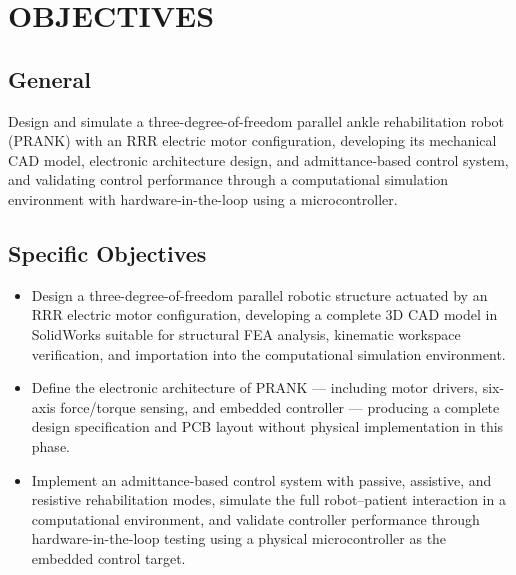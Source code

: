 \chapter{OBJECTIVES}\label{objectives}

\section{General}

Design and simulate a three-degree-of-freedom parallel ankle rehabilitation robot (PRANK)
with an RRR electric motor configuration, developing its mechanical CAD model, electronic
architecture design, and admittance-based control system, and validating control
performance through a computational simulation environment with hardware-in-the-loop using a microcontroller.

\section{Specific Objectives}
\begin{itemize}
    \item Design a three-degree-of-freedom parallel robotic structure actuated by an RRR
    electric motor configuration, developing a complete 3D CAD model in SolidWorks
    suitable for structural FEA analysis, kinematic workspace verification, and
    importation into the computational simulation environment.

    \item Define the electronic architecture of PRANK — including motor drivers, six-axis
    force/torque sensing, and embedded controller — producing a complete
    design specification and PCB layout without physical implementation in this phase.

    \item Implement an admittance-based control system with passive, assistive, and
    resistive rehabilitation modes, simulate the full robot--patient interaction in a
    computational environment, and validate controller performance through hardware-in-the-loop
    testing using a physical microcontroller as the embedded control target.
\end{itemize}
